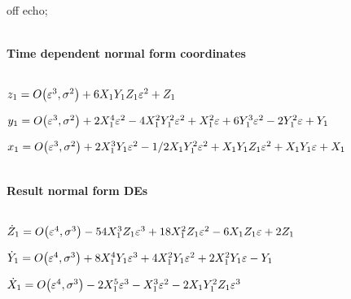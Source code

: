 \documentclass[11pt,a5paper]{article}
\begin{document}


off echo;

\(\)
\paragraph{Time dependent normal form coordinates}
\(
\)\par
\(z_{1}=O\big(\varepsilon ^{3},\sigma^{2}\big)+6 X_{1} Y_{1} Z_{1} \varepsilon^{2
}+Z_{1}
\)\par
\(y_{1}=O\big(\varepsilon ^{3},\sigma^{2}\big)+2 X_{1}^{4} \varepsilon^{2}-4 X_{1
}^{2} Y_{1}^{2} \varepsilon^{2}+X_{1}^{2} \varepsilon+6 Y_{1}^{3} \varepsilon^{2}-2 Y_{1}^{2}
 \varepsilon+Y_{1}
\)\par
\(x_{1}=O\big(\varepsilon ^{3},\sigma^{2}\big)+2 X_{1}^{3} Y_{1} \varepsilon^{2}-
1/2 X_{1} Y_{1}^{2} \varepsilon^{2}+X_{1} Y_{1} Z_{1} \varepsilon^{2}+X_{1} Y_{1} \varepsilon
+X_{1}
\)\par
\(\)
\paragraph{Result normal form DEs}
\(
\)\par
\(\dot Z_{1}=O\big(\varepsilon ^{4},\sigma^{3}\big)-54 X_{1}^{3} Z_{1} 
\varepsilon^{3}+18 X_{1}^{2} Z_{1} \varepsilon^{2}-6 X_{1} Z_{1} \varepsilon+2 Z_{1}
\)\par
\(\dot Y_{1}=O\big(\varepsilon ^{4},\sigma^{3}\big)+8 X_{1}^{4} Y_{1} \varepsilon
^{3}+4 X_{1}^{2} Y_{1} \varepsilon^{2}+2 X_{1}^{2} Y_{1} \varepsilon-Y_{1}
\)\par
\(\dot X_{1}=O\big(\varepsilon ^{4},\sigma^{3}\big)-2 X_{1}^{5} \varepsilon^{3}-X
_{1}^{3} \varepsilon^{2}-2 X_{1} Y_{1}^{2} Z_{1} \varepsilon^{3}
\)\par
\end{document}

